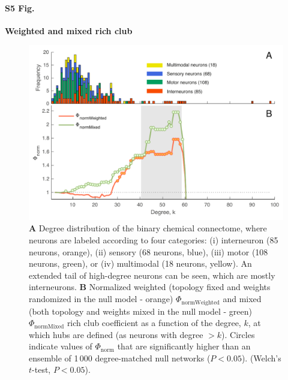 \documentclass[10pt,letterpaper]{article}
\begin{document}
\paragraph*{S5 Fig.}
{\bf Weighted and mixed rich club}
\begin{figure}[!h]
\label{S5_Fig}
\centering
    \includegraphics[width=1\textwidth]{WeightedMixedRC.pdf}
    \caption{\textbf{A} Degree distribution of the binary chemical connectome, where neurons are labeled according to four categories:
(i) interneuron (85 neurons, orange),
(ii) sensory (68 neurons, blue),
(iii) motor (108 neurons, green), or
(iv) multimodal (18 neurons, yellow).
An extended tail of high-degree neurons can be seen, which are mostly interneurons.
\textbf{B}
Normalized weighted (topology fixed and weights randomized in the null model - orange) $\Phi_\mathrm{normWeighted}$ and mixed (both topology and weights mixed in the null model - green) $\Phi_\mathrm{normMixed}$ rich club coefficient as a function of the degree, $k$, at which hubs are defined (as neurons with degree $>k$).
Circles indicate values of $\Phi_\mathrm{norm}$ that are significantly higher than an ensemble of 1\,000 degree-matched null networks ($P < 0.05$).
(Welch's $t$-test, $P < 0.05$).
}
\end{figure}

\end{document}
